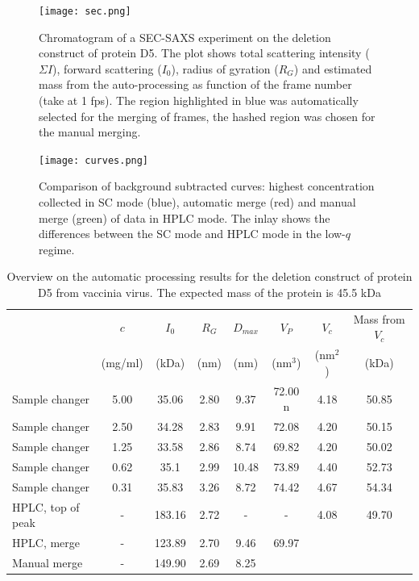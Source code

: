 \documentclass[preprint,pdf]{iucr}              %
\begin{document}
\begin{figure}
\centering
\texttt{[image: sec.png]}
\caption{Chromatogram of a SEC-SAXS experiment on the deletion construct of
protein D5.
The plot shows total scattering intensity ($\Sigma I$), forward scattering
($I_0$), radius of gyration ($R_G$) and estimated mass from the
auto-processing as function of the frame number (take at 1 fps).
The region highlighted in blue was automatically selected for the merging of
frames, the hashed region was chosen for the manual merging.}
\label{fgr:SEC}
\end{figure}

\begin{figure}
\centering
\texttt{[image: curves.png]}
\caption{Comparison of background subtracted curves: highest concentration
collected in SC mode (blue), automatic merge (red) and manual
merge (green) of data in HPLC mode. 
The inlay shows the differences between the SC mode and HPLC mode in the
low-$q$ regime. }
\label{fgr:curves}
\end{figure}

\begin{table}
\begin{tabular}{ l c | c c c c c c }
   & $c$  & $I_{0}$  & $R_{G}$ & $D_{max}$ & $V_{P}$ & $V_{c}$ & Mass from $V_{c}$\\
	 &  (mg/ml) & (kDa) & (nm)&  (nm)&  (nm$^{3}$) & (nm$^{2}$) & (kDa)\\
\hline
Sample changer & 5.00  & 35.06 & 2.80 & 9.37  & 72.00 n& 4.18 & 50.85 \\
Sample changer & 2.50  & 34.28 & 2.83  & 9.91  & 72.08 & 4.20 & 50.15 \\
Sample changer & 1.25 & 33.58& 2.86  & 8.74  & 69.82 & 4.20 & 50.02 \\
Sample changer & 0.62  & 35.1& 2.99  & 10.48 & 73.89 & 4.40 & 52.73 \\
Sample changer & 0.31 & 35.83  & 3.26  & 8.72  & 74.42& 4.67 & 54.34 \\
HPLC, top of peak & - & 183.16 & 2.72  & -  & - & 4.08 & 49.70 \\
HPLC, merge & - & 123.89 & 2.70  & 9.46 & 69.97 & &  \\
Manual merge & - &  149.90 & 2.69 & 8.25 & & &  \\
\end{tabular}
\caption{Overview on the automatic processing results for the deletion construct of protein D5 from vaccinia virus. 
The expected mass of the protein is 45.5 kDa}
\label{tbl:results}
\end{table}
\end{document}
